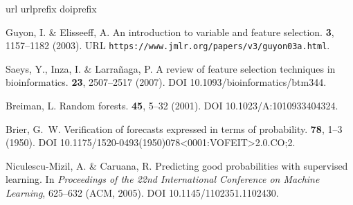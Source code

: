 \documentclass[fleqn,10pt]{wlscirep}
\begin{document}
\begin{thebibliography}{10}
\expandafter\ifx\csname url\endcsname\relax
  \def\url#1{\texttt{#1}}\fi
\expandafter\ifx\csname urlprefix\endcsname\relax\def\urlprefix{URL }\fi
\expandafter\ifx\csname doiprefix\endcsname\relax\def\doiprefix{DOI }\fi
\providecommand{\bibinfo}[2]{#2}

\bibinfo{author}{Guyon, I.} \& \bibinfo{author}{Elisseeff, A.}
\newblock \bibinfo{journal}{\bibinfo{title}{An introduction to variable and
  feature selection}}.
  \textbf{\bibinfo{volume}{3}}, \bibinfo{pages}{1157--1182}
  (\bibinfo{year}{2003}).
\newblock \urlprefix\url{https://www.jmlr.org/papers/v3/guyon03a.html}.

\bibinfo{author}{Saeys, Y.}, \bibinfo{author}{Inza, I.} \&
  \bibinfo{author}{Larra{\~n}aga, P.}
\newblock \bibinfo{journal}{\bibinfo{title}{A review of feature selection
  techniques in bioinformatics}}.
 \textbf{\bibinfo{volume}{23}},
  \bibinfo{pages}{2507--2517} (\bibinfo{year}{2007}).
\newblock \doiprefix 10.1093/bioinformatics/btm344.

\bibinfo{author}{Breiman, L.}
\newblock \bibinfo{journal}{\bibinfo{title}{Random forests}}.
  \textbf{\bibinfo{volume}{45}}, \bibinfo{pages}{5--32} (\bibinfo{year}{2001}).
\newblock \doiprefix 10.1023/A:1010933404324.

\bibinfo{author}{Brier, G.~W.}
\newblock \bibinfo{journal}{\bibinfo{title}{Verification of forecasts expressed
  in terms of probability}}.
  \textbf{\bibinfo{volume}{78}}, \bibinfo{pages}{1--3} (\bibinfo{year}{1950}).
\newblock \doiprefix 10.1175/1520-0493(1950)078<0001:VOFEIT>2.0.CO;2.

\bibinfo{author}{Niculescu-Mizil, A.} \& \bibinfo{author}{Caruana, R.}
\newblock \bibinfo{title}{Predicting good probabilities with supervised
  learning}.
\newblock In \emph{\bibinfo{booktitle}{Proceedings of the 22nd International
  Conference on Machine Learning}}, \bibinfo{pages}{625--632}
  (\bibinfo{publisher}{ACM}, \bibinfo{year}{2005}).
\newblock \doiprefix 10.1145/1102351.1102430.


\end{thebibliography}
\end{document}
